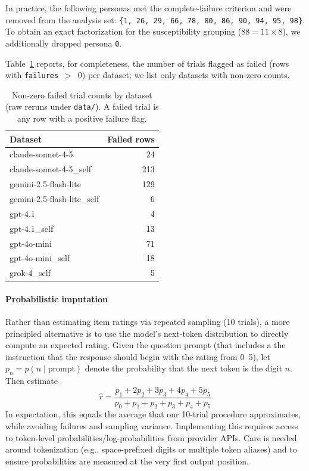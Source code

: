 \documentclass{article}
\begin{document}
In practice, the following personas met the complete-failure criterion and were removed from the analysis set: \texttt{\{1, 26, 29, 66, 78, 80, 86, 90, 94, 95, 98\}}. To obtain an exact factorization for the susceptibility grouping (\(88 = 11 \times 8\)), we additionally dropped persona \texttt{0}.

Table~\ref{tab:failures_by_model} reports, for completeness, the number of trials flagged as failed (rows with \texttt{failures}~$>$~0) per dataset; we list only datasets with non-zero counts.

\begin{table}[t]
  \centering
  \caption{Non-zero failed trial counts by dataset (raw reruns under \texttt{data/}). A failed trial is any row with a positive failure flag.}
  \label{tab:failures_by_model}
  \begin{tabular}{lr}
    \toprule
    Dataset & Failed rows \\
    \midrule
    claude-sonnet-4-5 & 24 \\
    claude-sonnet-4-5\_self & 213 \\
    gemini-2.5-flash-lite & 129 \\
    gemini-2.5-flash-lite\_self & 6 \\
    gpt-4.1 & 4 \\
    gpt-4.1\_self & 13 \\
    gpt-4o-mini & 71 \\
    gpt-4o-mini\_self & 18 \\
    grok-4\_self & 5 \\
    \bottomrule
  \end{tabular}
\end{table}

\paragraph{Probabilistic imputation}
Rather than estimating item ratings via repeated sampling (10 trials), a more principled alternative is to use the model’s next-token distribution to directly compute an expected rating. Given the question prompt (that includes a the instruction that the response should begin with the rating from 0--5), let \(p_n = p(n\mid\text{prompt})\) denote the probability that the next token is the digit \(n\). Then estimate
\begin{equation}
  \hat r = \frac{p_1+2p_2+3p_3+4p_4+5p_5}{p_0+p_1+p_2+p_3+p_4+p_5}
\end{equation}
In expectation, this equals the average that our 10-trial procedure approximates, while avoiding failures and sampling variance. Implementing this requires access to token-level probabilities/log-probabilities from provider APIs. Care is needed around tokenization (e.g., space-prefixed digits or multiple token aliases) and to ensure probabilities are measured at the very first output position.
\end{document}
